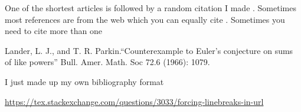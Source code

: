 \documentclass[12pt]{article}
\begin{document}

One of the shortest articles \cite{bib_entry1} is followed by a random citation I made \cite{whatever_name_you_want}. Sometimes most references are from the web which you can equally cite \cite{cool_paper_from_web}. Sometimes you need to cite more than one \cite{bib_entry1,whatever_name_you_want,cool_paper_from_web}



\begin{thebibliography}{99} %
Lander, L. J., and T. R. Parkin.``Counterexample to Euler’s conjecture on sums of like powers'' Bull. Amer. Math. Soc 72.6 (1966): 1079.

I just made up my own bibliography format

\url{https://tex.stackexchange.com/questions/3033/forcing-linebreaks-in-url}

\end{thebibliography}
\end{document}
